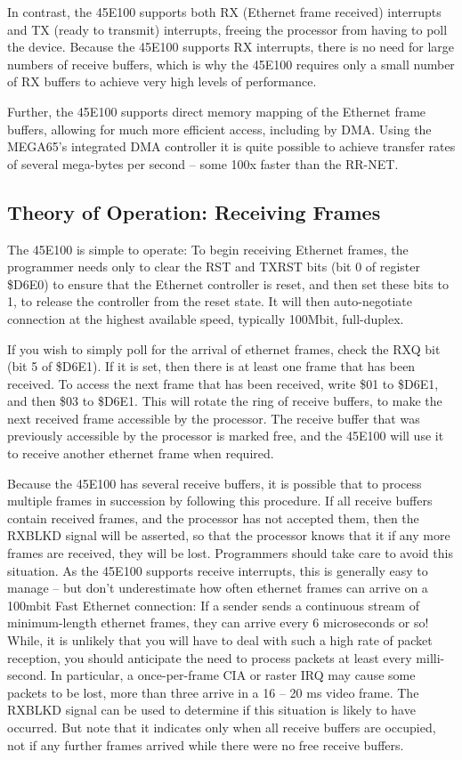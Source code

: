 In contrast, the 45E100 supports both RX (Ethernet frame received) interrupts and TX
(ready to transmit) interrupts, freeing the processor from having to poll
the device. Because the 45E100 supports RX interrupts, there is no need for large
numbers of receive buffers, which is why the 45E100 requires only a small number of RX buffers
to achieve very high levels of performance.

Further, the 45E100 supports direct memory mapping of the
Ethernet frame buffers, allowing for much more efficient access, including
by DMA.  Using the MEGA65's integrated DMA controller it is quite possible
to achieve transfer rates of several mega-bytes per second -- some 100x
faster than the RR-NET.

\subsection{Theory of Operation: Receiving Frames}

The 45E100 is simple to operate: To begin receiving Ethernet frames, the programmer
needs only to clear the RST and TXRST bits (bit 0 of register \$D6E0) to ensure that the
Ethernet controller is reset, and then set these bits to 1, to release the controller from the reset state.
It will then auto-negotiate connection at the highest available speed, typically 100Mbit, full-duplex.

If you wish to simply poll for the arrival of ethernet frames, check the RXQ bit (bit 5 of \$D6E1).
If it is set, then there is at least one frame that has been received.  To access the next frame that
has been received, write \$01 to \$D6E1, and then \$03 to \$D6E1.  This will rotate the ring of receive
buffers, to make the next received frame accessible by the processor. The receive buffer that was previously
accessible by the processor is marked free, and the 45E100 will use it to receive another ethernet frame when required.

Because the 45E100 has several receive buffers, it is possible that to process multiple frames in succession by
following this procedure. If all receive buffers contain received frames, and the processor has not accepted them, then
the RXBLKD signal will be asserted, so that the processor knows that it if any more frames are received, they will be lost.
Programmers should take care to avoid this situation.  As the 45E100 supports receive interrupts, this is generally easy
to manage -- but don't underestimate how often ethernet frames can arrive on a 100mbit Fast Ethernet connection:
If a sender sends a continuous stream of minimum-length ethernet frames, they can arrive every 6 microseconds or so!
While, it is unlikely that you will have to deal with such a high rate of packet reception, you should anticipate the need
to process packets at least every milli-second. In particular, a once-per-frame CIA or raster IRQ may cause some packets
to be lost, more than three arrive in a 16 -- 20 ms video frame.  The RXBLKD signal can be used to determine if this situation
is likely to have occurred. But note that it indicates only when all receive buffers are occupied, not if any further frames
arrived while there were no free receive buffers.

